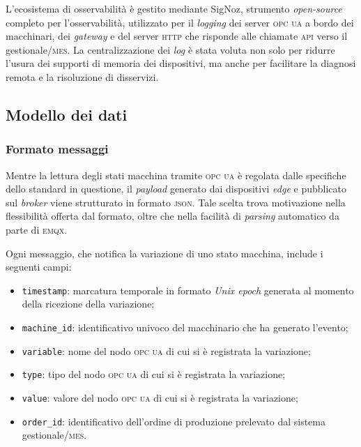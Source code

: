 \documentclass[12pt]{article}
\begin{document}
    L'ecosistema di osservabilità è gestito mediante SigNoz, strumento \textit{open-source} completo per l'osservabilità, utilizzato per il \textit{logging} dei server \textsc{opc ua} a bordo dei macchinari, dei \textit{gateway} e del server \textsc{http} che risponde alle chiamate \textsc{api} verso il gestionale/\textsc{mes}. La centralizzazione dei \textit{log} è stata voluta non solo per ridurre l'usura dei supporti di memoria dei dispositivi, ma anche per facilitare la diagnosi remota e la risoluzione di disservizi.
    
    \subsection{Modello dei dati}

    \subsubsection{Formato messaggi}

    Mentre la lettura degli stati macchina tramite \textsc{opc ua} è regolata dalle specifiche dello standard in questione, il \textit{payload} generato dai dispositivi \textit{edge} e pubblicato sul \textit{broker} viene strutturato in formato \textsc{json}. Tale scelta trova motivazione nella flessibilità offerta dal formato, oltre che nella facilità di \textit{parsing} automatico da parte di \textsc{emqx}.

    Ogni messaggio, che notifica la variazione di uno stato macchina, include i seguenti campi:
    \begin{itemize}
        \item \verb|timestamp|: marcatura temporale in formato \textit{Unix epoch} generata al momento della ricezione della variazione;
        \item \verb|machine_id|: identificativo univoco del macchinario che ha generato l'evento;
        \item \verb|variable|: nome del nodo \textsc{opc ua} di cui si è registrata la variazione;
        \item \verb|type|: tipo del nodo \textsc{opc ua} di cui si è registrata la variazione;
        \item \verb|value|: valore del nodo \textsc{opc ua} di cui si è registrata la variazione;
        \item \verb|order_id|: identificativo dell'ordine di produzione prelevato dal sistema gestionale/\textsc{mes}.
    \end{itemize}
\end{document}
